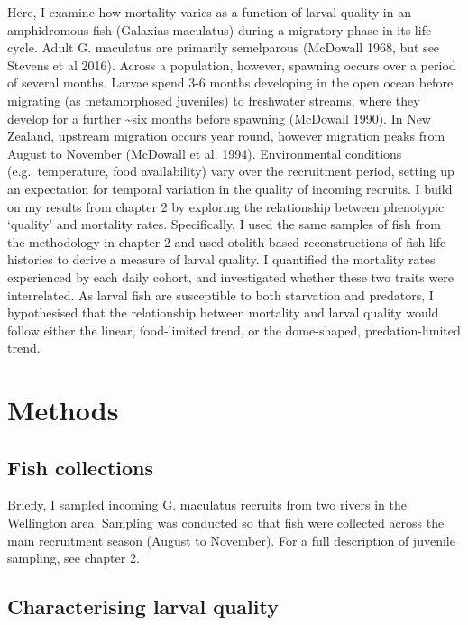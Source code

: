 \documentclass[]{book}
\begin{document}
Here, I examine how mortality varies as a function of larval quality in
an amphidromous fish (Galaxias maculatus) during a migratory phase in
its life cycle. Adult G. maculatus are primarily semelparous (McDowall
1968, but see Stevens et al 2016). Across a population, however,
spawning occurs over a period of several months. Larvae spend 3-6 months
developing in the open ocean before migrating (as metamorphosed
juveniles) to freshwater streams, where they develop for a further
\textasciitilde{}six months before spawning (McDowall 1990). In New
Zealand, upstream migration occurs year round, however migration peaks
from August to November (McDowall et al. 1994). Environmental conditions
(e.g.~temperature, food availability) vary over the recruitment period,
setting up an expectation for temporal variation in the quality of
incoming recruits. I build on my results from chapter 2 by exploring the
relationship between phenotypic `quality' and mortality rates.
Specifically, I used the same samples of fish from the methodology in
chapter 2 and used otolith based reconstructions of fish life histories
to derive a measure of larval quality. I quantified the mortality rates
experienced by each daily cohort, and investigated whether these two
traits were interrelated. As larval fish are susceptible to both
starvation and predators, I hypothesised that the relationship between
mortality and larval quality would follow either the linear,
food-limited trend, or the dome-shaped, predation-limited trend.

\section{Methods}\label{methods-1}

\subsection{Fish collections}\label{fish-collections-1}

Briefly, I sampled incoming G. maculatus recruits from two rivers in the
Wellington area. Sampling was conducted so that fish were collected
across the main recruitment season (August to November). For a full
description of juvenile sampling, see chapter 2.

\subsection{Characterising larval
quality}\label{characterising-larval-quality}
\end{document}
